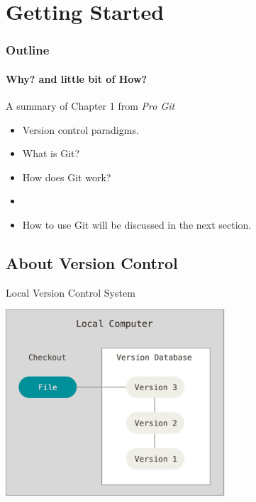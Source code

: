 \section{Getting Started}
\begin{frame}[t]
  \frametitle{Outline}
  \framesubtitle{Why? and little bit of How?}
\end{frame}

\begin{frame}[t]{A summary of Chapter 1 from {\it Pro Git}}
  \begin{itemize}
    \item Version control paradigms.
    \item What is Git?
    \item How does Git work?
    \item[]
    \item How to use Git will be discussed in the next section.
  \end{itemize}
\end{frame}

\subsection{About Version Control}
\begin{frame}[t]{Local Version Control System}
  \begin{center}
    \includegraphics[height=2.75in]{../images/02-getting-started/local}
  \end{center}
\end{frame}

